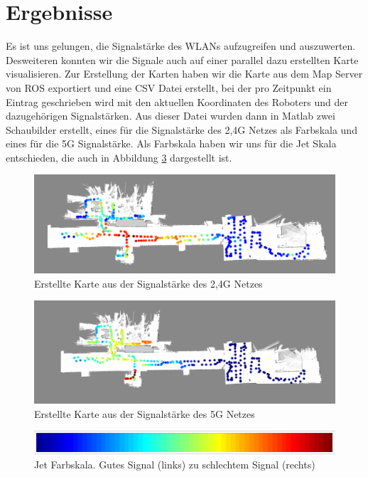 \documentclass{scrartcl}%
\begin{document}
\newpage
\section{Ergebnisse}
Es ist uns gelungen, die Signalstärke des WLANs aufzugreifen und auszuwerten. Desweiteren konnten wir die Signale auch auf einer parallel dazu erstellten Karte visualisieren. Zur Erstellung der Karten haben wir die Karte aus dem Map Server von ROS exportiert und eine CSV Datei erstellt, bei der pro Zeitpunkt ein Eintrag geschrieben wird mit den aktuellen Koordinaten des Roboters und der dazugehörigen Signalstärken. Aus dieser Datei wurden dann in Matlab zwei Schaubilder erstellt, eines für die Signalstärke des 2,4G Netzes als Farbskala und eines für die 5G Signalstärke. Als Farbskala haben wir uns für die Jet Skala entschieden, die auch in Abbildung \ref{skala} dargestellt ist.

\begin{figure}[h!]
	\centering
	\includegraphics[width=\textwidth]{bilder/wlan-heatmap-2G4.png}
	\caption{Erstellte Karte aus der Signalstärke des 2,4G Netzes}
	\label{2g4}
\end{figure}

\begin{figure}[h!]
	\centering
	\includegraphics[width=\textwidth]{bilder/wlan-heatmap-5G.png}
	\caption{Erstellte Karte aus der Signalstärke des 5G Netzes}
	\label{5g}
\end{figure}

\begin{figure}[h!]
	\centering
	\includegraphics[width=\textwidth]{bilder/JetFarbskala.png}
	\caption{Jet Farbskala. Gutes Signal (links) zu schlechtem Signal (rechts)}
	\label{skala}
\end{figure}
\end{document}
